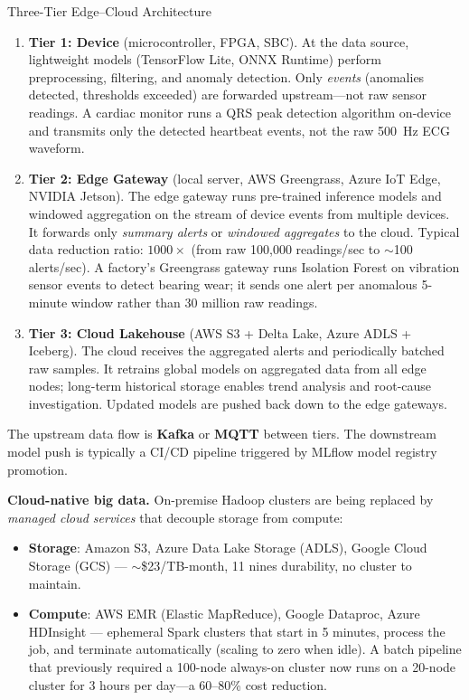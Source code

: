 \begin{defbox}{Three-Tier Edge--Cloud Architecture}
\begin{enumerate}
  \item \textbf{Tier 1: Device} (microcontroller, FPGA, SBC).
        At the data source, lightweight models (TensorFlow Lite, ONNX
        Runtime) perform preprocessing, filtering, and anomaly detection.
        Only \emph{events} (anomalies detected, thresholds exceeded) are
        forwarded upstream---not raw sensor readings. A cardiac monitor
        runs a QRS peak detection algorithm on-device and transmits only
        the detected heartbeat events, not the raw 500~Hz ECG waveform.
  \item \textbf{Tier 2: Edge Gateway} (local server, AWS Greengrass,
        Azure IoT Edge, NVIDIA Jetson).
        The edge gateway runs pre-trained inference models and windowed
        aggregation on the stream of device events from multiple devices.
        It forwards only \emph{summary alerts} or \emph{windowed
        aggregates} to the cloud. Typical data reduction ratio: $1000\times$
        (from raw 100{,}000 readings/sec to $\sim$100 alerts/sec).
        A factory's Greengrass gateway runs Isolation Forest on vibration
        sensor events to detect bearing wear; it sends one alert per
        anomalous 5-minute window rather than 30 million raw readings.
  \item \textbf{Tier 3: Cloud Lakehouse} (AWS S3 + Delta Lake,
        Azure ADLS + Iceberg).
        The cloud receives the aggregated alerts and periodically batched
        raw samples. It retrains global models on aggregated data from all
        edge nodes; long-term historical storage enables trend analysis
        and root-cause investigation. Updated models are pushed back
        down to the edge gateways.
\end{enumerate}
The upstream data flow is \textbf{Kafka} or \textbf{MQTT} between tiers.
The downstream model push is typically a CI/CD pipeline triggered by
MLflow model registry promotion.
\end{defbox}

\textbf{Cloud-native big data.} On-premise Hadoop clusters are being
replaced by \emph{managed cloud services} that decouple storage from
compute:
\begin{itemize}
  \item \textbf{Storage}: Amazon S3, Azure Data Lake Storage (ADLS),
        Google Cloud Storage (GCS) --- $\sim$\$23/TB-month, 11 nines
        durability, no cluster to maintain.
  \item \textbf{Compute}: AWS EMR (Elastic MapReduce), Google Dataproc,
        Azure HDInsight --- ephemeral Spark clusters that start in 5
        minutes, process the job, and terminate automatically (scaling
        to zero when idle). A batch pipeline that previously required
        a 100-node always-on cluster now runs on a 20-node cluster for
        3 hours per day---a 60--80\% cost reduction.
\end{itemize}

